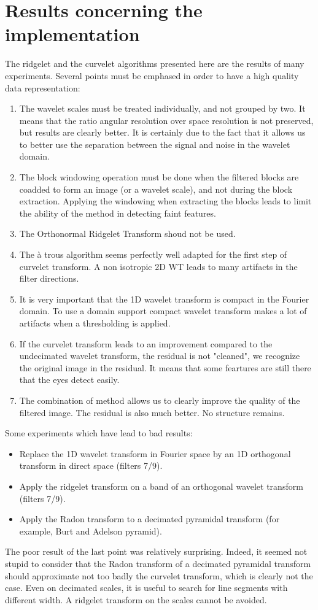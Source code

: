 \documentclass[11pt,a4paper]{article}
\begin{document}
\section{Results concerning the implementation}
The ridgelet and the curvelet algorithms presented here are the results of many 
experiments. Several points must be emphased in order to
have a high quality data representation:
\begin{enumerate}
\item The wavelet scales must be treated individually, and not grouped
by two. It means that the ratio angular resolution over space resolution
is not preserved, but results are clearly better. It is certainly due
to the fact that it allows us to better use  the separation 
between the signal and  noise in the wavelet domain.
\item The block windowing operation must be done when the filtered blocks 
are coadded to form an image (or a wavelet scale), and not 
during the block extraction. Applying the windowing when extracting the blocks
leads to limit the ability of the method in detecting faint features.
\item The Orthonormal Ridgelet Transform shoud not be used.
\item The \`a trous algorithm seems perfectly well adapted for the first step
of curvelet transform. A non isotropic 2D WT leads to many artifacts
in the filter directions.
\item It is very important that the 1D wavelet transform is compact in
the Fourier domain. To use a domain support compact wavelet transform
makes a lot of artifacts when a thresholding is applied. 
\item If the curvelet transform leads to an improvement compared to the
undecimated wavelet transform, the residual is not "cleaned", we recognize
the original image in the residual. It means that some feartures are 
still there that the eyes detect easily. 
\item The combination of method allows us to clearly improve the quality
of the filtered image. The residual is also much better. No structure
remains. 
\end{enumerate}

Some experiments which have lead to bad results:
\begin{itemize}
\item Replace the 1D wavelet transform in Fourier space by an 1D 
orthogonal transform in direct space (filters 7/9).
\item Apply the ridgelet transform on a band of an orthogonal wavelet
transform (filters 7/9).
\item Apply the Radon transform to a decimated pyramidal transform
(for example, Burt and Adelson pyramid).
\end{itemize}
The poor result of the last point was relatively surprising. Indeed,
it seemed not stupid to consider that the  Radon transform of a decimated
pyramidal transform should approximate not too badly the curvelet transform,
which is clearly not the case. Even on decimated scales, it is useful
to search for line segments with different width. A ridgelet transform on the
scales cannot be avoided.
\end{document}
